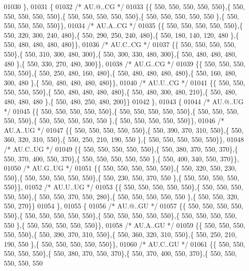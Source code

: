 \begin{DoxyCode}
01030 \},
01031 \{
01032 \textcolor{comment}{/* AU.@..CG */}
01033 \{\{ 550, 550, 550, 550, 550\},\{ 550, 550, 550, 550, 550\},\{ 550, 550, 550, 550, 550\},\{ 550, 550, 550, 550, 550
      \},\{ 550, 550, 550, 550, 550\}\},
01034 \textcolor{comment}{/* AU.A..CG */}
01035 \{\{ 550, 550, 550, 550, 550\},\{ 550, 320, 300, 240, 480\},\{ 550, 290, 250, 240, 480\},\{ 550, 180, 140, 120, 480
      \},\{ 550, 480, 480, 480, 480\}\},
01036 \textcolor{comment}{/* AU.C..CG */}
01037 \{\{ 550, 550, 550, 550, 550\},\{ 550, 310, 300, 480, 300\},\{ 550, 300, 330, 480, 300\},\{ 550, 480, 480, 480, 480
      \},\{ 550, 330, 270, 480, 300\}\},
01038 \textcolor{comment}{/* AU.G..CG */}
01039 \{\{ 550, 550, 550, 550, 550\},\{ 550, 250, 480, 160, 480\},\{ 550, 480, 480, 480, 480\},\{ 550, 160, 480, 300, 480
      \},\{ 550, 480, 480, 480, 480\}\},
01040 \textcolor{comment}{/* AU.U..CG */}
01041 \{\{ 550, 550, 550, 550, 550\},\{ 550, 480, 480, 480, 480\},\{ 550, 480, 300, 480, 210\},\{ 550, 480, 480, 480, 480
      \},\{ 550, 480, 250, 480, 200\}\}
01042 \},
01043 \{
01044 \textcolor{comment}{/* AU.@..UG */}
01045 \{\{ 550, 550, 550, 550, 550\},\{ 550, 550, 550, 550, 550\},\{ 550, 550, 550, 550, 550\},\{ 550, 550, 550, 550, 550
      \},\{ 550, 550, 550, 550, 550\}\},
01046 \textcolor{comment}{/* AU.A..UG */}
01047 \{\{ 550, 550, 550, 550, 550\},\{ 550, 390, 370, 310, 550\},\{ 550, 360, 320, 310, 550\},\{ 550, 250, 210, 190, 550
      \},\{ 550, 550, 550, 550, 550\}\},
01048 \textcolor{comment}{/* AU.C..UG */}
01049 \{\{ 550, 550, 550, 550, 550\},\{ 550, 380, 370, 550, 370\},\{ 550, 370, 400, 550, 370\},\{ 550, 550, 550, 550, 550
      \},\{ 550, 400, 340, 550, 370\}\},
01050 \textcolor{comment}{/* AU.G..UG */}
01051 \{\{ 550, 550, 550, 550, 550\},\{ 550, 320, 550, 230, 550\},\{ 550, 550, 550, 550, 550\},\{ 550, 230, 550, 370, 550
      \},\{ 550, 550, 550, 550, 550\}\},
01052 \textcolor{comment}{/* AU.U..UG */}
01053 \{\{ 550, 550, 550, 550, 550\},\{ 550, 550, 550, 550, 550\},\{ 550, 550, 370, 550, 280\},\{ 550, 550, 550, 550, 550
      \},\{ 550, 550, 320, 550, 270\}\}
01054 \},
01055 \{
01056 \textcolor{comment}{/* AU.@..GU */}
01057 \{\{ 550, 550, 550, 550, 550\},\{ 550, 550, 550, 550, 550\},\{ 550, 550, 550, 550, 550\},\{ 550, 550, 550, 550, 550
      \},\{ 550, 550, 550, 550, 550\}\},
01058 \textcolor{comment}{/* AU.A..GU */}
01059 \{\{ 550, 550, 550, 550, 550\},\{ 550, 390, 370, 310, 550\},\{ 550, 360, 320, 310, 550\},\{ 550, 250, 210, 190, 550
      \},\{ 550, 550, 550, 550, 550\}\},
01060 \textcolor{comment}{/* AU.C..GU */}
01061 \{\{ 550, 550, 550, 550, 550\},\{ 550, 380, 370, 550, 370\},\{ 550, 370, 400, 550, 370\},\{ 550, 550, 550, 550, 550

\end{DoxyCode}
